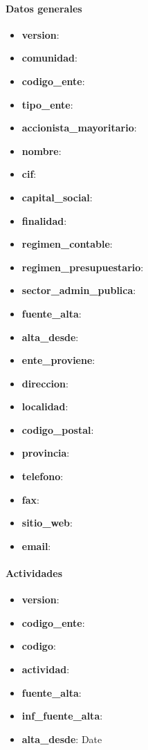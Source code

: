 \documentclass[12pt]{article}
\begin{document}
\paragraph{Datos generales\\}
\begin{itemize}
    \item \textbf{version}:
    \item \textbf{comunidad}:
    \item \textbf{codigo\_ente}:
    \item \textbf{tipo\_ente}: 
    \item \textbf{accionista\_mayoritario}:
    \item \textbf{nombre}:
    \item \textbf{cif}:
    \item \textbf{capital\_social}:
    \item \textbf{finalidad}:
    \item \textbf{regimen\_contable}:
    \item \textbf{regimen\_presupuestario}:
    \item \textbf{sector\_admin\_publica}:
    \item \textbf{fuente\_alta}: 
    \item \textbf{alta\_desde}:
    \item \textbf{ente\_proviene}: 
    \item \textbf{direccion}: 
    \item \textbf{localidad}: 
    \item \textbf{codigo\_postal}: 
    \item \textbf{provincia}: 
    \item \textbf{telefono}: 
    \item \textbf{fax}: 
    \item \textbf{sitio\_web}: 
    \item \textbf{email}:  
\end{itemize}

\paragraph{Actividades\\}
\begin{itemize}
    \item \textbf{version}:
    \item \textbf{codigo\_ente}:
    \item \textbf{codigo}:
    \item \textbf{actividad}:
    \item \textbf{fuente\_alta}:
    \item \textbf{inf\_fuente\_alta}:
    \item \textbf{alta\_desde}: Date
\end{itemize}
\end{document}
